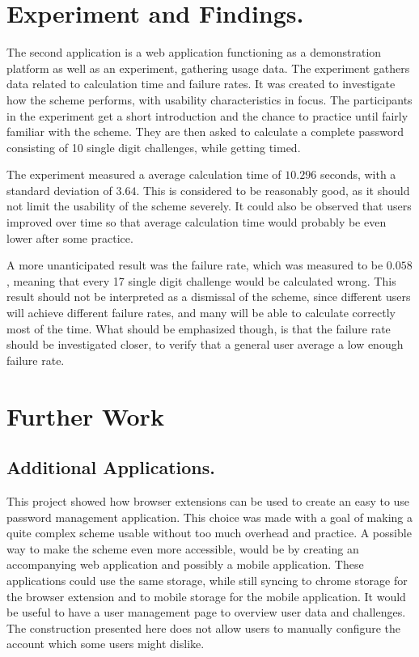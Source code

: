 \section{Experiment and Findings.}
\par The second application is a web application functioning as a demonstration platform as well as an experiment, gathering usage data. The experiment gathers data related to calculation time and failure rates. It was created to investigate how the scheme performs, with usability characteristics in focus. The participants in the experiment get a short introduction and the chance to practice until fairly familiar with the scheme. They are then asked to calculate a complete password consisting of 10 single digit challenges, while getting timed.
\par The experiment measured a average calculation time of $10.296$ seconds, with a standard deviation of $3.64$. This is considered to be reasonably good, as it should not limit the usability of the scheme severely. It could also be observed that users improved over time so that average calculation time would probably be even lower after some practice. 
\par A more unanticipated result was the failure rate, which was measured to be $0.058$, meaning that every 17 single digit challenge would be calculated wrong. This result should not be interpreted as a dismissal of the scheme, since different users will achieve different failure rates, and many will be able to calculate correctly most of the time. What should be emphasized though, is that the failure rate should be investigated closer, to verify that a general user average a low enough failure rate. 


\section{Further Work}

\subsection{Additional Applications.}
This project showed how browser extensions can be used to create an easy to use password management application. This choice was made with a goal of making a quite complex scheme usable without too much overhead and practice. A possible way to make the scheme even more accessible, would be by creating an accompanying web application and possibly a mobile application. These applications could use the same storage, while still syncing to chrome storage for the browser extension and to mobile storage for the mobile application. It would be useful to have a user management page to overview user data and challenges. The construction presented here does not allow users to manually configure the account which some users might dislike. 

